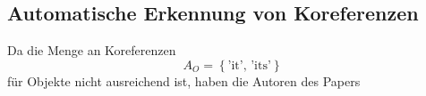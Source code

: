 \subsection{Automatische Erkennung von Koreferenzen}
Da die Menge an Koreferenzen 
\[A_O=\left\{\text{'it', 'its'}\right\}\]
für Objekte nicht ausreichend ist, haben die Autoren des Papers \NaNg\cite{paper:Na}

